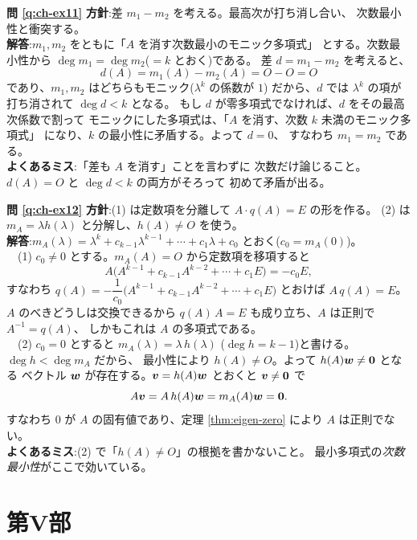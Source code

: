\bigskip
\noindent\textbf{問 \ref{q:ch-ex11}}\quad
\textbf{方針}:差 $m_1 - m_2$ を考える。最高次が打ち消し合い、
次数最小性と衝突する。\\
\textbf{解答}:$m_1, m_2$ をともに「$A$ を消す次数最小のモニック多項式」
とする。次数最小性から $\deg m_1 = \deg m_2$($= k$ とおく)である。
差 $d = m_1 - m_2$ を考えると、
\[
d(A) = m_1(A) - m_2(A) = O - O = O
\]
であり、$m_1, m_2$ はどちらもモニック($\lambda^k$ の係数が $1$)
だから、$d$ では $\lambda^k$ の項が打ち消されて $\deg d < k$ となる。
もし $d$ が零多項式でなければ、$d$ をその最高次係数で割って
モニックにした多項式は、「$A$ を消す、次数 $k$ 未満のモニック多項式」
になり、$k$ の最小性に矛盾する。よって $d = 0$、
すなわち $m_1 = m_2$ である。\\
\textbf{よくあるミス}:「差も $A$ を消す」ことを言わずに
次数だけ論じること。$d(A) = O$ と $\deg d < k$ の両方がそろって
初めて矛盾が出る。

\bigskip
\noindent\textbf{問 \ref{q:ch-ex12}}\quad
\textbf{方針}:(1) は定数項を分離して $A \cdot q(A) = E$ の形を作る。
(2) は $m_A = \lambda h(\lambda)$ と分解し、$h(A) \neq O$ を使う。\\
\textbf{解答}:$m_A(\lambda) = \lambda^k + c_{k-1}\lambda^{k-1} + \cdots
+ c_1\lambda + c_0$ とおく($c_0 = m_A(0)$)。\\
　(1) $c_0 \neq 0$ とする。$m_A(A) = O$ から定数項を移項すると
\[
A\bigl(A^{k-1} + c_{k-1}A^{k-2} + \cdots + c_1E\bigr) = -c_0 E,
\]
すなわち $q(A) = -\dfrac{1}{c_0}\bigl(A^{k-1} + c_{k-1}A^{k-2} + \cdots
+ c_1E\bigr)$ とおけば $A\,q(A) = E$。$A$ のべきどうしは交換できるから
$q(A)\,A = E$ も成り立ち、$A$ は正則で $A^{-1} = q(A)$、
しかもこれは $A$ の多項式である。\\
　(2) $c_0 = 0$ とすると $m_A(\lambda) = \lambda\,h(\lambda)$
($\deg h = k - 1$)と書ける。$\deg h < \deg m_A$ だから、
最小性により $h(A) \neq O$。よって $h(A)\bm{w} \neq \bm{0}$ となる
ベクトル $\bm{w}$ が存在する。$\bm{v} = h(A)\bm{w}$ とおくと
$\bm{v} \neq \bm{0}$ で
\[
A\bm{v} = A\,h(A)\bm{w} = m_A(A)\bm{w} = \bm{0}.
\]
すなわち $0$ が $A$ の固有値であり、定理 \ref{thm:eigen-zero} により
$A$ は正則でない。\\
\textbf{よくあるミス}:(2) で「$h(A) \neq O$」の根拠を書かないこと。
最小多項式の\emph{次数最小性}がここで効いている。

\section*{第V部}

